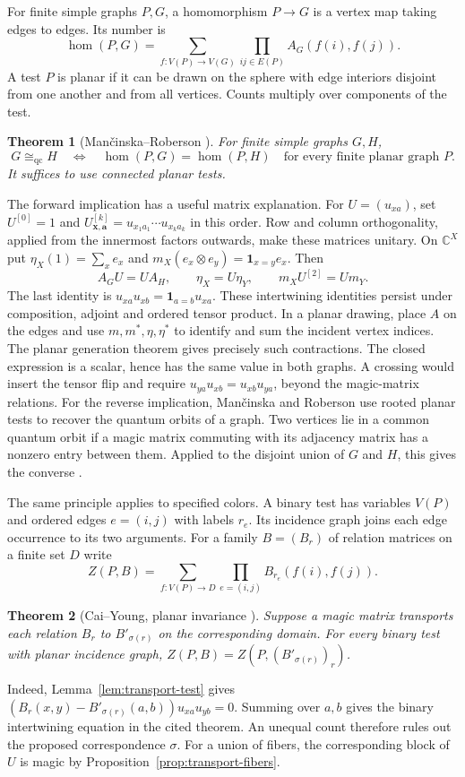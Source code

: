 \documentclass[11pt,reqno]{amsart}
\numberwithin{equation}{section}
\newtheorem{theorem}{Theorem}[section]
\theoremstyle{definition}
\newcommand{\qc}{\mathrm{qc}}
\newcommand{\homc}{\operatorname{hom}}
\begin{document}
For finite simple graphs $P,G$, a homomorphism $P\to G$ is a vertex map taking edges to edges. Its number is
\[
 \homc(P,G)=\sum_{f:V(P)\to V(G)}\prod_{ij\in E(P)}A_G(f(i),f(j)).
\]
A test $P$ is planar if it can be drawn on the sphere with edge interiors disjoint from one another and from all vertices. Counts multiply over components of the test.

\begin{theorem}[Man\v{c}inska--Roberson {\cite[Thm.~7.16]{MR}}]\label{thm:planar-mr}
For finite simple graphs $G,H$,
\[
 G\cong_{\qc}H\quad\Longleftrightarrow\quad
 \homc(P,G)=\homc(P,H)\quad\text{for every finite planar graph }P .
\]
It suffices to use connected planar tests.
\end{theorem}

The forward implication has a useful matrix explanation. For $U=(u_{xa})$, set $U^{[0]}=1$ and $U^{[k]}_{\mathbf x,\mathbf a}=u_{x_1a_1}\cdots u_{x_ka_k}$ in this order. Row and column orthogonality, applied from the innermost factors outwards, make these matrices unitary. On $\mathbb C^X$ put $\eta_X(1)=\sum_x e_x$ and $m_X(e_x\otimes e_y)=\mathbf1_{x=y}e_x$. Then
\[
 A_GU=UA_H,\qquad \eta_X=U\eta_Y,\qquad m_XU^{[2]}=Um_Y.
\]
The last identity is $u_{xa}u_{xb}=\mathbf1_{a=b}u_{xa}$. These intertwining identities persist under composition, adjoint and ordered tensor product. In a planar drawing, place $A$ on the edges and use $m,m^*,\eta,\eta^*$ to identify and sum the incident vertex indices. The planar generation theorem \cite[Thm.~6.7]{MR} gives precisely such contractions. The closed expression is a scalar, hence has the same value in both graphs. A crossing would insert the tensor flip and require $u_{ya}u_{xb}=u_{xb}u_{ya}$, beyond the magic-matrix relations. For the reverse implication, Man\v{c}inska and Roberson use rooted planar tests to recover the quantum orbits of a graph. Two vertices lie in a common quantum orbit if a magic matrix commuting with its adjacency matrix has a nonzero entry between them. Applied to the disjoint union of $G$ and $H$, this gives the converse \cite[\S\S6--7]{MR}.

The same principle applies to specified colors. A binary test has variables $V(P)$ and ordered edges $e=(i,j)$ with labels $r_e$. Its incidence graph joins each edge occurrence to its two arguments. For a family $B=(B_r)$ of relation matrices on a finite set $D$ write
\[
 Z(P,B)=\sum_{f:V(P)\to D}\prod_{e=(i,j)}B_{r_e}(f(i),f(j)).
\]
\begin{theorem}[Cai--Young, planar invariance {\cite[Thm.~9]{CY}}]\label{thm:planar-colors}
Suppose a magic matrix transports each relation $B_r$ to $B'_{\sigma(r)}$ on the corresponding domain. For every binary test with planar incidence graph, $Z(P,B)=Z(P,(B'_{\sigma(r)})_r)$.
\end{theorem}
Indeed, Lemma~\ref{lem:transport-test} gives $(B_r(x,y)-B'_{\sigma(r)}(a,b))u_{xa}u_{yb}=0$. Summing over $a,b$ gives the binary intertwining equation in the cited theorem. An unequal count therefore rules out the proposed correspondence $\sigma$. For a union of fibers, the corresponding block of $U$ is magic by Proposition~\ref{prop:transport-fibers}.
\end{document}
